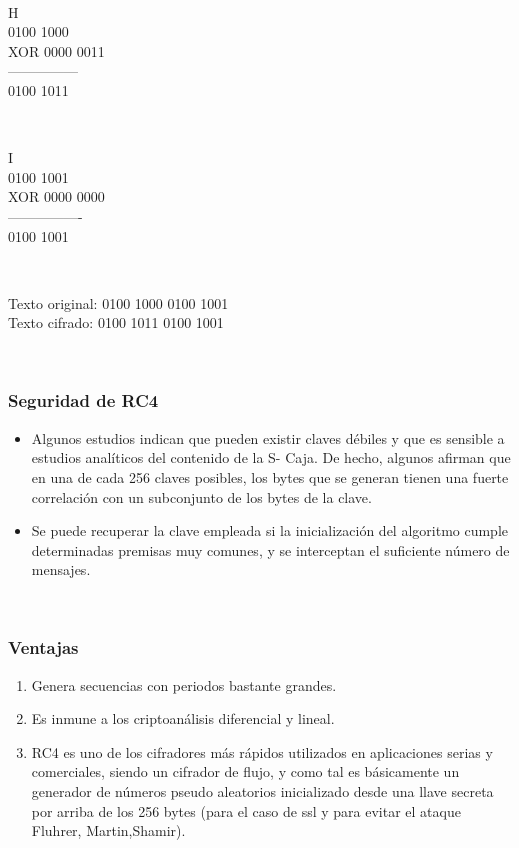 \documentclass[11pt, conference]{IEEEtran}
\begin{document}
\

H \\
0100 1000\\ 
XOR 0000 0011\\ 
--------------- \\
0100 1011 

\

I \\
0100 1001 \\
XOR 0000 0000\\ 
---------------- \\ 
0100 1001 

\

Texto original: 0100 1000 0100 1001\\
Texto cifrado: 0100 1011 0100 1001	

\

\subsubsection{Seguridad de RC4}
\begin{itemize}
	\item Algunos estudios indican que pueden existir claves débiles y que es sensible a estudios analíticos del contenido de la S- Caja. De hecho, algunos afirman que en una de cada 256 claves posibles, los bytes que se generan tienen una fuerte correlación con un subconjunto de los bytes de la clave.

	\item Se puede recuperar la clave empleada si la inicialización del algoritmo cumple determinadas premisas muy comunes, y se interceptan el suficiente número de mensajes. 

\end{itemize}

\

\subsubsection{Ventajas}

\begin{enumerate}
	\item Genera secuencias con periodos bastante grandes.
	\item Es inmune a los criptoanálisis diferencial y lineal.
	
	\item RC4 es uno de los cifradores más rápidos utilizados en aplicaciones serias y comerciales, siendo un cifrador de flujo, y como tal es básicamente un generador de números pseudo aleatorios inicializado desde una llave secreta por arriba de los 256 bytes (para el caso de ssl y para evitar el ataque Fluhrer, Martin,Shamir).	
\end{enumerate}	
\end{document}
